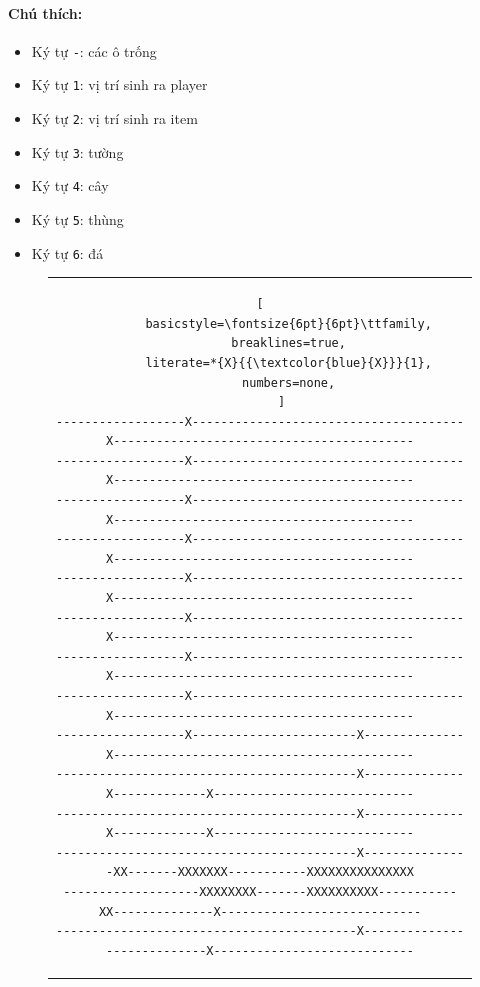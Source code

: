\documentclass[12pt,a4paper]{article}
\begin{document}
  \paragraph{Chú thích:}
  \begin{itemize}
      \item Ký tự \texttt{-}: các ô trống
      \item Ký tự \texttt{1}: vị trí sinh ra player
      \item Ký tự \texttt{2}: vị trí sinh ra item
      \item Ký tự \texttt{3}: tường
      \item Ký tự \texttt{4}: cây
      \item Ký tự \texttt{5}: thùng
      \item Ký tự \texttt{6}: đá
  \end{itemize}
  \begin{figure}[H]
    \centering
    \begin{tabular}{c}
      \begin{lstlisting}[
        basicstyle=\fontsize{6pt}{6pt}\ttfamily,
        breaklines=true,
        literate=*{X}{{\textcolor{blue}{X}}}{1},
        numbers=none,
      ]
------------------X--------------------------------------X------------------------------------------
------------------X--------------------------------------X------------------------------------------
------------------X--------------------------------------X------------------------------------------
------------------X--------------------------------------X------------------------------------------
------------------X--------------------------------------X------------------------------------------
------------------X--------------------------------------X------------------------------------------
------------------X--------------------------------------X------------------------------------------
------------------X--------------------------------------X------------------------------------------
------------------X-----------------------X--------------X------------------------------------------
------------------------------------------X--------------X-------------X----------------------------
------------------------------------------X--------------X-------------X----------------------------
------------------------------------------X---------------XX-------XXXXXXX-----------XXXXXXXXXXXXXXX
-------------------XXXXXXXX-------XXXXXXXXXX-----------XX--------------X----------------------------
------------------------------------------X----------------------------X----------------------------

\end{lstlisting}
\end{tabular}
\end{figure}
\end{document}
